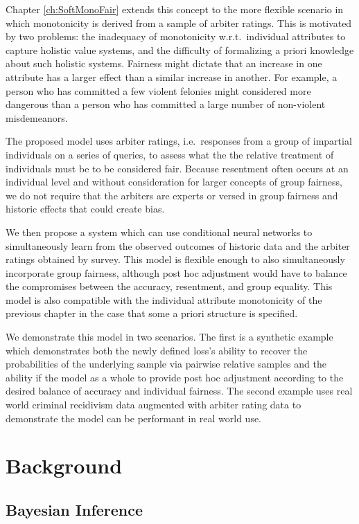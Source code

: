 Chapter \ref{ch:SoftMonoFair} extends this concept to the more flexible scenario in which monotonicity is derived from a sample of arbiter ratings. This is motivated by two problems: the inadequacy of monotonicity w.r.t.\ individual attributes to capture holistic value systems, and the difficulty of formalizing a priori knowledge about such holistic systems. Fairness might dictate that an increase in one attribute has a larger effect than a similar increase in another.  For example, a person who has committed a few violent felonies might considered more dangerous than a person who has committed a large number of non-violent misdemeanors.

The proposed model uses arbiter ratings, i.e.\ responses from a group of impartial individuals on a series of queries, to assess what the the relative treatment of individuals must be to be considered fair.  Because resentment often occurs at an individual level and without consideration for larger concepts of group fairness, we do not require that the arbiters are experts or versed in group fairness and historic effects that could create bias.

We then propose a system which can use conditional neural networks to simultaneously learn from the observed outcomes of historic data and the arbiter ratings obtained by survey.  This model is flexible enough to also simultaneously incorporate group fairness, although post hoc adjustment would have to balance the compromises between the accuracy, resentment, and group equality.  This model is also compatible with the individual attribute monotonicity of the previous chapter in the case that some a priori structure is specified.

We demonstrate this model in two scenarios.  The first is a synthetic example which demonstrates both the newly defined loss's ability to recover the probabilities of the underlying sample via pairwise relative samples and the ability if the model as a whole to provide post hoc adjustment according to the desired balance of accuracy and individual fairness.  The second example uses real world criminal recidivism data augmented with arbiter rating data to demonstrate the model can be performant in real world use.

\section{Background}

    \subsection{Bayesian Inference} \label{sec:intro_bayes}
    
